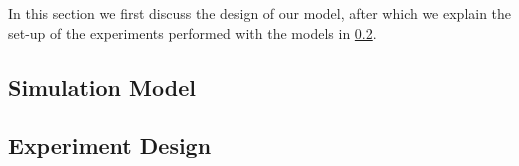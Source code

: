 In this section we first discuss the design of our model, after which we explain the set-up of the experiments performed with the models in \cref{sub:method:design}.

\subsection{Simulation Model}
\label{sub:method:model}



\subsection{Experiment Design}
\label{sub:method:design}

